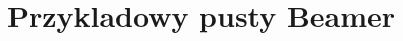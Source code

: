 \documentclass[]{beamer}
\title{Przykladowy pusty Beamer}
\date{}
\begin{document}
\frame
{
\maketitle
}
\end{document}
